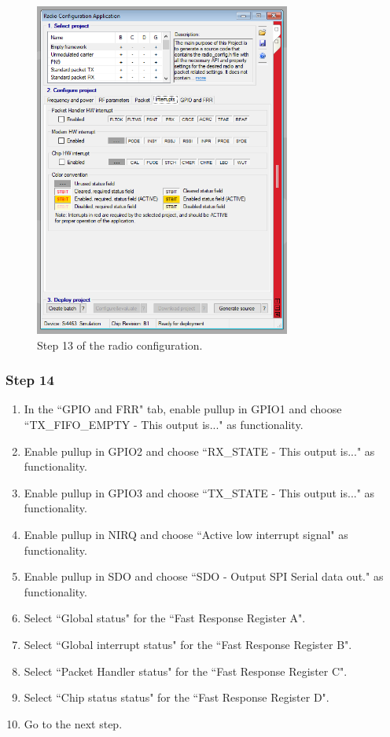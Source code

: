 \begin{figure}[!h]
	\begin{center}
		\includegraphics[width=0.75\textwidth]{figures/wds-tutorial-13.png}
		\caption{Step 13 of the radio configuration.}
		\label{fig:wds-tutorial-step-13}
	\end{center}
\end{figure}

\subsubsection{Step 14}

\begin{enumerate}
    \item In the ``GPIO and FRR" tab, enable pullup in GPIO1 and choose ``TX\_FIFO\_EMPTY - This output is..." as functionality.
    \item Enable pullup in GPIO2 and choose ``RX\_STATE - This output is..." as functionality.
    \item Enable pullup in GPIO3 and choose ``TX\_STATE - This output is..." as functionality.
    \item Enable pullup in NIRQ and choose ``Active low interrupt signal" as functionality.
    \item Enable pullup in SDO and choose ``SDO - Output SPI Serial data out." as functionality.
    \item Select ``Global status" for the ``Fast Response Register A".
    \item Select ``Global interrupt status" for the ``Fast Response Register B".
    \item Select ``Packet Handler status" for the ``Fast Response Register C".
    \item Select ``Chip status status" for the ``Fast Response Register D".
    \item Go to the next step.
\end{enumerate}

